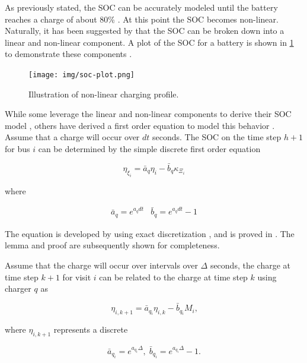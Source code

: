 \documentclass[ee,thesis]{usuthesis}
\begin{document}
As previously stated, the SOC can be accurately modeled until the battery reaches a charge of about 80\%
\cite{liu-2020-batter-elect}. At this point the SOC becomes non-linear. Naturally, it has been suggested by
\cite{zhang-2021-optim-elect} that the SOC can be broken down into a linear and non-linear component. A plot of the SOC
for a battery is shown in \ref{fig:soc-plot} to demonstrate these components \cite{zhang-2021-optim-elect}.

\begin{figure}[htbp]
\centering
\texttt{[image: img/soc-plot.png]}
\caption{\label{fig:soc-plot}Illustration of non-linear charging profile.}
\end{figure}

While some leverage the linear and non-linear components to derive their SOC model \cite{abdollahi-2016-optim-batter},
others have derived a first order equation to model this behavior \cite{whitaker-2023-a-network}. Assume that a charge
will occur over \(dt\) seconds. The SOC on the time step \(h+1\) for bus \(i\) can be determined by the simple discrete first
order equation

\begin{equation}
  \eta_{\xi_i} = \bar{a}_q \eta_i - \bar{b}_q \kappa_{\Xi_i}
\end{equation}

where

\begin{equation}
\begin{array}{cc}
  \bar{a}_q = e^{a_q dt} & \bar{b}_q = e^{a_q dt} - 1
\end{array}
\end{equation}

The equation is developed by using exact discretization \cite{brogan-1990-moder-contr-theor}, and is proved in
\cite{whitaker-2023-a-network}. The lemma and proof are subsequently shown for completeness.

\begin{lemma}
Assume that the charge will occur over intervals over $\Delta$ seconds, the charge at time step $k+1$ for visit $i$ can be related to the charge at time step $k$ using charger $q$ as

\begin{equation}
\eta_{i,k+1} = \bar{a}_{q_i} \eta_{i,k} - \bar{b}_{q_i} M_i\text{,}
\end{equation}

where $\eta_{i, k+1}$ represents a discrete

\begin{equation}
\label{eq:nonlin-discrete-model}
\bar{a}_{q_i} = e^{a_{q_i} \Delta},\; \bar{b}_{q_i} = e^{a_{q_i} \Delta} - 1\text{.}
\end{equation}
\end{lemma}
\end{document}
